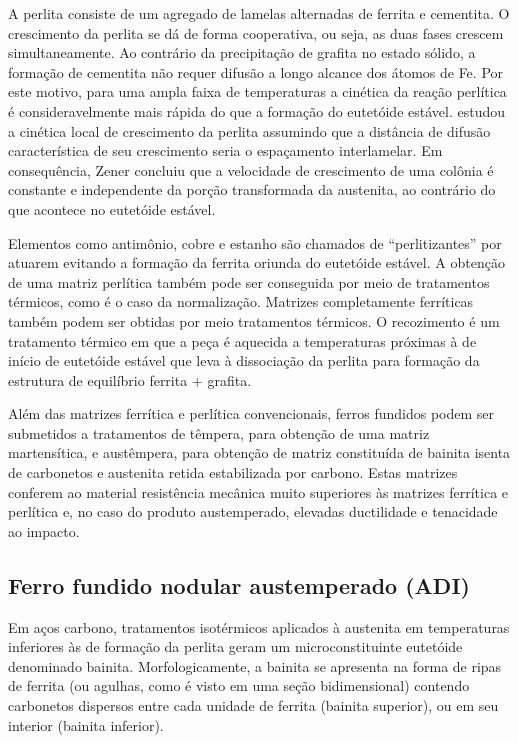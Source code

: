 A perlita consiste de um agregado de lamelas alternadas de ferrita e cementita. O crescimento da perlita se dá de forma cooperativa, ou seja, as duas fases crescem simultaneamente. Ao contrário da precipitação de grafita no estado sólido, a formação de cementita não requer difusão a longo alcance dos átomos de Fe. Por este motivo, para uma ampla faixa de temperaturas a cinética da reação perlítica é consideravelmente mais rápida do que a formação do eutetóide estável.  estudou a cinética local de crescimento da perlita assumindo que a distância de difusão característica de seu crescimento seria o espaçamento interlamelar. Em consequência, Zener concluiu que a velocidade de crescimento de uma colônia é constante e independente da porção transformada da austenita, ao contrário do que acontece no eutetóide estável.

Elementos como antimônio, cobre e estanho são chamados de ``perlitizantes'' por atuarem evitando a formação da ferrita oriunda do eutetóide estável\cite{Kovacs1981}.
A obtenção de uma matriz perlítica também pode ser conseguida por meio de tratamentos térmicos, como é o caso da normalização. Matrizes completamente ferríticas também podem ser obtidas por meio tratamentos térmicos. O recozimento é um tratamento térmico em que a peça é aquecida a temperaturas próximas à de início de eutetóide estável que leva à dissociação da perlita para formação da estrutura de equilíbrio ferrita + grafita\cite{Guesser2009}.

Além das matrizes ferrítica e perlítica convencionais, ferros fundidos podem ser submetidos a tratamentos de têmpera, para obtenção de uma matriz martensítica, e austêmpera, para obtenção de matriz constituída de bainita isenta de carbonetos e austenita retida estabilizada por carbono. Estas matrizes conferem ao material resistência mecânica muito superiores às matrizes ferrítica e perlítica e, no caso do produto austemperado, elevadas ductilidade e tenacidade ao impacto\cite{Guesser2009}.


\subsection{Ferro fundido nodular austemperado (ADI)}

\label{subsec:ADI}

Em aços carbono, tratamentos isotérmicos aplicados à austenita em temperaturas inferiores às de formação da perlita geram um microconstituinte eutetóide denominado bainita. Morfologicamente, a bainita se apresenta na forma de ripas de ferrita (ou agulhas, como é visto em uma seção bidimensional) contendo carbonetos dispersos entre cada unidade de ferrita (bainita superior), ou em seu interior (bainita inferior).

